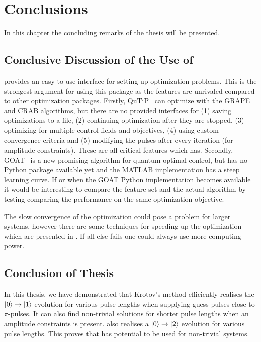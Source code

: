 \documentclass[main.tex]{subfiles}
\begin{document}
\chapter{Conclusions}
In this chapter the concluding remarks of the thesis will be presented.

\section{Conclusive Discussion of the Use of \krotov{}}
\label{sec:general}
\krotov{} provides an easy-to-use interface for setting up optimization problems.
This is the strongest argument for using this package as the features are unrivaled compared to other optimization packages.
Firstly, QuTiP~\cite{johansson_qutip_2013} can optimize with the GRAPE and CRAB algorithms, but there are no provided interfaces for
(1) saving optimizations to a file,
(2) continuing optimization after they are stopped,
(3) optimizing for multiple control fields and objectives,
(4) using custom convergence criteria and 
(5) modifying the pulses after every iteration (for amplitude constraints).
These are all critical features which \krotov{} has.
Secondly, GOAT~\cite{machnes_gradient_2015} is a new promising algorithm for quantum optimal control, but has no Python package available yet and the MATLAB implementation has a steep learning curve.
If or when the GOAT Python implementation becomes available it would be interesting to compare the feature set and the actual algorithm by testing comparing the performance on the same optimization objective.

The slow convergence of the optimization could pose a problem for larger systems, however there are some techniques for speeding up the optimization which are presented in .
If all else fails one could always use more computing power.

\section{Conclusion of Thesis}
In this thesis, we have demonstrated that Krotov's method efficiently realises the \(\ket{0}\rightarrow\ket{1}\) evolution for various pulse lengths when supplying guess pulses close to \(\pi\)-pulses.
It can also find non-trivial solutions for shorter pulse lengths when an amplitude constraints is present.
\krotov{} also realises a \(\ket{0}\rightarrow\ket{2}\) evolution for various pulse lengths.
This proves that \krotov{} has potential to be used for non-trivial systems.
\end{document}
